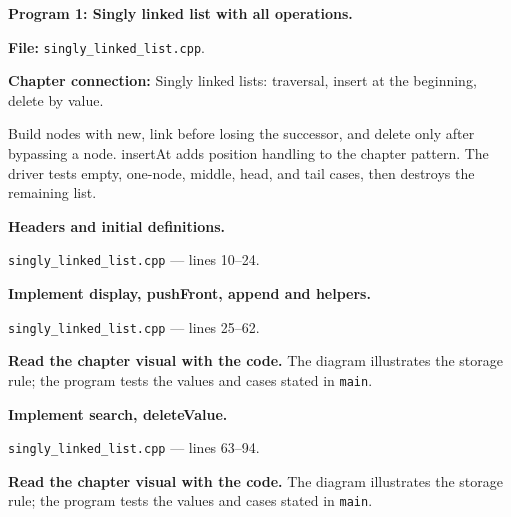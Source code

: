 \textbf{Program 1: Singly linked list with all operations.}

\textbf{File:} \texttt{singly\_linked\_list.cpp}.

\textbf{Chapter connection:} Singly linked lists: traversal, insert at the beginning, delete by value.

Build nodes with new, link before losing the successor, and delete only after bypassing a node. insertAt adds position handling to the chapter pattern. The driver tests empty, one-node, middle, head, and tail cases, then destroys the remaining list.



\begin{utpsteps}\setcounter{enumi}{0}\item \textbf{Headers and initial definitions.}\end{utpsteps}

\texttt{singly\_linked\_list.cpp} --- lines 10--24.




\tcbbreak

\begin{utpsteps}\setcounter{enumi}{1}\item \textbf{Implement display, pushFront, append and helpers.}\end{utpsteps}

\texttt{singly\_linked\_list.cpp} --- lines 25--62.



\textbf{Read the chapter visual with the code.} The diagram illustrates the storage rule; the program tests the values and cases stated in \texttt{main}.





\tcbbreak

\begin{utpsteps}\setcounter{enumi}{2}\item \textbf{Implement search, deleteValue.}\end{utpsteps}

\texttt{singly\_linked\_list.cpp} --- lines 63--94.

\textbf{Read the chapter visual with the code.} The diagram illustrates the storage rule; the program tests the values and cases stated in \texttt{main}.


